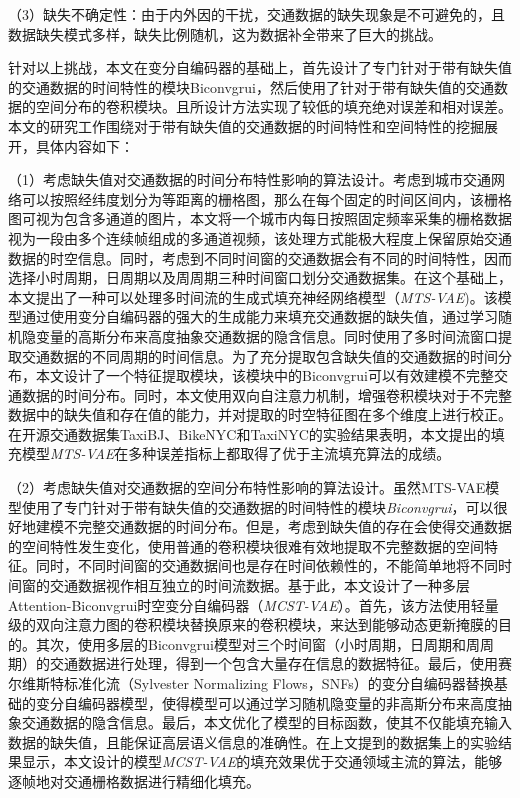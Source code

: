 （3）缺失不确定性：由于内外因的干扰，交通数据的缺失现象是不可避免的，且数据缺失模式多样，缺失比例随机，这为数据补全带来了巨大的挑战。

针对以上挑战，本文在变分自编码器的基础上，首先设计了专门针对于带有缺失值的交通数据的时间特性的模块Biconvgrui，然后使用了针对于带有缺失值的交通数据的空间分布的卷积模块。且所设计方法实现了较低的填充绝对误差和相对误差。本文的研究工作围绕对于带有缺失值的交通数据的时间特性和空间特性的挖掘展开，具体内容如下：

（1）考虑缺失值对交通数据的时间分布特性影响的算法设计。考虑到城市交通网络可以按照经纬度划分为等距离的栅格图，那么在每个固定的时间区间内，该栅格图可视为包含多通道的图片，本文将一个城市内每日按照固定频率采集的栅格数据视为一段由多个连续帧组成的多通道视频，该处理方式能极大程度上保留原始交通数据的时空信息。同时，考虑到不同时间窗的交通数据会有不同的时间特性，因而选择小时周期，日周期以及周周期三种时间窗口划分交通数据集。在这个基础上，本文提出了一种可以处理多时间流的生成式填充神经网络模型（\textit{MTS-VAE})。该模型通过使用变分自编码器的强大的生成能力来填充交通数据的缺失值，通过学习随机隐变量的高斯分布来高度抽象交通数据的隐含信息。同时使用了多时间流窗口提取交通数据的不同周期的时间信息。为了充分提取包含缺失值的交通数据的时间分布，本文设计了一个特征提取模块，该模块中的Biconvgrui可以有效建模不完整交通数据的时间分布。同时，本文使用双向自注意力机制，增强卷积模块对于不完整数据中的缺失值和存在值的能力，并对提取的时空特征图在多个维度上进行校正。在开源交通数据集TaxiBJ、BikeNYC和TaxiNYC的实验结果表明，本文提出的填充模型\textit{MTS-VAE}在多种误差指标上都取得了优于主流填充算法的成绩。

（2）考虑缺失值对交通数据的空间分布特性影响的算法设计。虽然MTS-VAE模型使用了专门针对于带有缺失值的交通数据的时间特性的模块\textit{Biconvgrui}，可以很好地建模不完整交通数据的时间分布。但是，考虑到缺失值的存在会使得交通数据的空间特性发生变化，使用普通的卷积模块很难有效地提取不完整数据的空间特征。同时，不同时间窗的交通数据间也是存在时间依赖性的，不能简单地将不同时间窗的交通数据视作相互独立的时间流数据。基于此，本文设计了一种多层Attention-Biconvgrui时空变分自编码器（\textit{MCST-VAE}）。首先，该方法使用轻量级的双向注意力图的卷积模块替换原来的卷积模块，来达到能够动态更新掩膜的目的。其次，使用多层的Biconvgrui模型对三个时间窗（小时周期，日周期和周周期）的交通数据进行处理，得到一个包含大量存在信息的数据特征。最后，使用赛尔维斯特标准化流（Sylvester Normalizing Flows，SNFs）的变分自编码器替换基础的变分自编码器模型，使得模型可以通过学习随机隐变量的非高斯分布来高度抽象交通数据的隐含信息。最后，本文优化了模型的目标函数，使其不仅能填充输入数据的缺失值，且能保证高层语义信息的准确性。在上文提到的数据集上的实验结果显示，本文设计的模型\textit{MCST-VAE}的填充效果优于交通领域主流的算法，能够逐帧地对交通栅格数据进行精细化填充。
